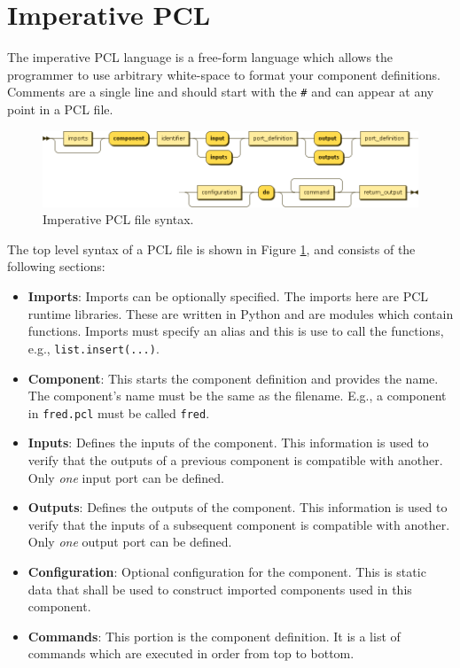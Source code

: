 \section{Imperative PCL}
The imperative PCL language is a free-form language which allows the programmer to use arbitrary white-space to format your component definitions. Comments are a single line and should start with the \texttt{\#} and can appear at any point in a PCL file.
\begin{figure}[h!]
  \centering
    \includegraphics[scale=\DiagramScale,angle=90]{chapters/adapter/diagrams/component}
  \caption{Imperative PCL file syntax.}
  \label{fig:imperative-pcl-top-level}
\end{figure}
The top level syntax of a PCL file is shown in Figure \ref{fig:imperative-pcl-top-level}, and consists of the following sections:
\begin{itemize}
\item \textbf{Imports}: Imports can be optionally specified. The imports here are PCL runtime libraries. These are written in Python and are modules which contain functions. Imports must specify an alias and this is use to call the functions, e.g., \texttt{list.insert(...)}.
\item \textbf{Component}: This starts the component definition and provides the name. The component's name must be the same as the filename. E.g., a component in \texttt{fred.pcl} must be called \texttt{fred}.
\item \textbf{Inputs}: Defines the inputs of the component. This information is used to verify that the outputs of a previous component is compatible with another. Only \emph{one} input port can be defined.
\item \textbf{Outputs}: Defines the outputs of the component. This information is used to verify that the inputs of a subsequent component is compatible with another. Only \emph{one} output port can be defined.
\item \textbf{Configuration}: Optional configuration for the component. This is static data that shall be used to construct imported components used in this component. 
\item \textbf{Commands}: This portion is the component definition. It is a list of commands which are executed in order from top to bottom.
\end{itemize}

